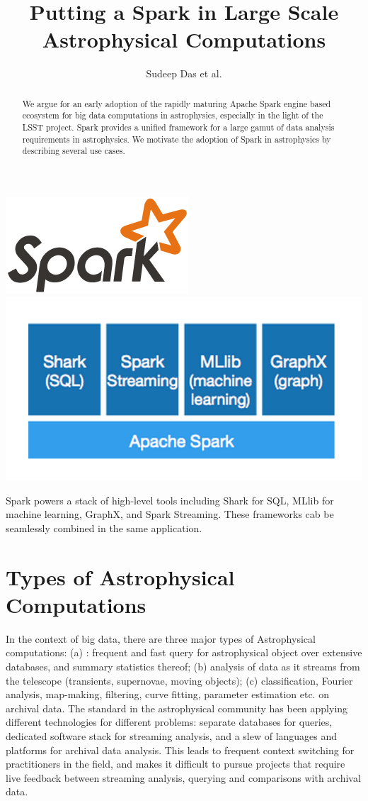 \documentclass{tufte-handout}
\title{Putting  a Spark in Large Scale Astrophysical Computations}
\author{Sudeep Das et al.}
\begin{document}
\maketitle
\begin{marginfigure}
\includegraphics[width=0.4\linewidth]{spark-logo}
\includegraphics[width=\linewidth]{spark.png}
\caption{Spark powers a stack of high-level tools including Shark for SQL, MLlib for machine learning, GraphX, and Spark Streaming. These frameworks  cab be seamlessly combined in the same application.}
\end{marginfigure}

\begin{abstract}
We  argue for an early adoption of the rapidly maturing  Apache Spark engine based ecosystem for  big data computations in astrophysics, especially in the light of the LSST project.  Spark provides a unified framework for a large gamut of data analysis requirements in astrophysics. We motivate the adoption of Spark in astrophysics by describing several use cases. 
\end{abstract}

\section{Types of Astrophysical Computations}
In the context of big data, there are three major types of Astrophysical computations: (a) : frequent and fast query for astrophysical object over extensive databases, and summary statistics thereof; 
(b)   analysis of data as it streams from the telescope
(transients, supernovae, moving objects); (c)  classification, Fourier analysis, 
map-making, filtering, curve fitting, parameter estimation etc. on archival data. The standard in the astrophysical community has been applying different technologies for different problems: separate databases for queries, dedicated software stack for streaming analysis, and a slew of languages and platforms for archival data analysis.  This leads to frequent context switching for practitioners in the field, and makes it difficult to pursue projects that require live feedback between streaming analysis, querying and comparisons with archival data.  
\end{document}
